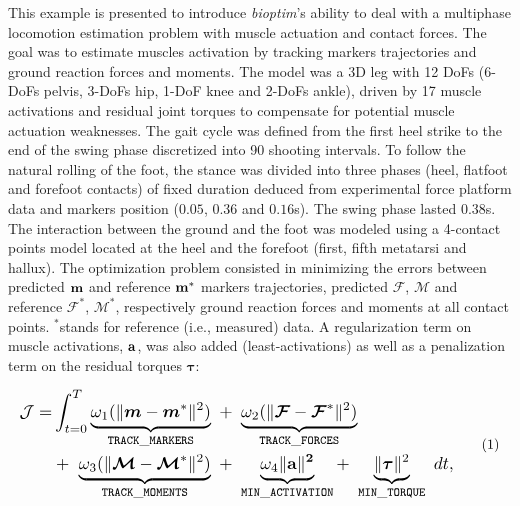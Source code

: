 This example is presented to introduce \textit{bioptim}'s ability to deal with a multiphase locomotion estimation problem with muscle actuation and contact forces.
The goal was to estimate muscles activation by tracking markers trajectories and ground reaction forces and moments. 
The model was a 3D leg with 12 DoFs (6-DoFs pelvis, 3-DoFs hip, 1-DoF knee and 2-DoFs ankle), driven by 17 muscle activations and residual joint torques to compensate for potential muscle actuation weaknesses. 
The gait cycle was defined from the first heel strike to the end of the swing phase discretized into 90 shooting intervals. 
To follow the natural rolling of the foot, the stance was divided into three phases (heel, flatfoot and forefoot contacts) of fixed duration deduced from experimental force platform data and markers position ($0.05$, $0.36$ and $0.16$\:s).
The swing phase lasted $0.38$\:s. 
The interaction between the ground and the foot was modeled using a 4-contact points model located at the heel and the forefoot (first, fifth metatarsi and hallux).
The optimization problem consisted in minimizing the errors between predicted $\bf{m}$ and reference $\bf{m}^*$ markers trajectories, predicted $\bm{\mathcal{F}}$, $\bm{\mathcal{M}}$ and reference $\bm{\mathcal{F}^*}$, $\bm{\mathcal{M}}^*$, respectively ground reaction forces and moments at all contact points.
$^*$stands for reference (i.e., measured) data.
A regularization term on muscle activations, $\bf{a}$, was also added (least-activations) as well as a penalization term on the residual torques $\boldsymbol{\tau}$:

\[ 
\resizebox{0.9\columnwidth}{!}{$ 
\begin{aligned}
\mathcal{J} = &\int_{t=0}^{T}\underbrace{\omega_1(\|\bm{m} - \bm{m}^*\|^{2})}_{\mathtt{TRACK\_MARKERS}}~ 
+ ~ \underbrace{\omega_2(\|\bm{\mathcal{F}} - \bm{\mathcal{F}}^*\|^{2})}_{\mathtt{TRACK\_FORCES}}\\
&+ ~ \underbrace{\omega_3(\|\bm{\mathcal{M}} - \bm{\mathcal{M}}^*\|^{2})}_{\mathtt{TRACK\_MOMENTS}}~
+ ~ \underbrace{\omega_4\|\bf{a}\|^2}_{\mathtt{MIN\_ACTIVATION}}
+ ~ \underbrace{\|\boldsymbol{\tau}\|^2}_{\mathtt{MIN\_TORQUE}}~dt, 
\end{aligned}  
$}  
\addtag  
\label{eq:ocp_walk}  
\]

